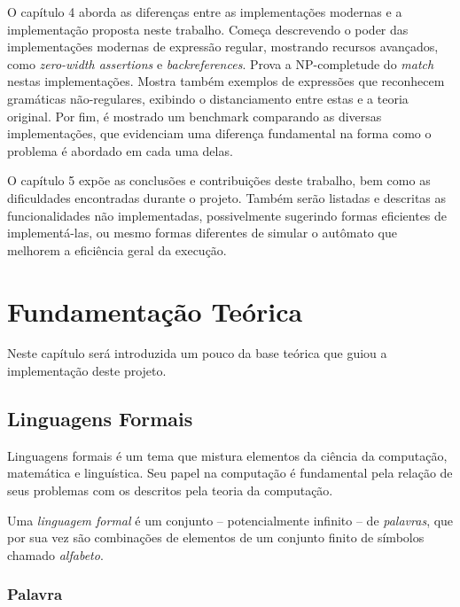 \documentclass[a4paper,12pt,oneside,onecolumn]{uerj}
\begin{document}
O capítulo 4 aborda as diferenças entre as implementações modernas e a implementação proposta neste trabalho. Começa descrevendo o poder das implementações modernas de expressão regular, mostrando recursos avançados, como \emph{zero-width assertions} e \emph{backreferences}. Prova a NP-completude do \emph{match} nestas implementações. Mostra também exemplos de expressões que reconhecem gramáticas não-regulares, exibindo o distanciamento entre estas e a teoria original. Por fim, é mostrado um benchmark comparando as diversas implementações, que evidenciam uma diferença fundamental na forma como o problema é abordado em cada uma delas.

O capítulo 5 expõe as conclusões e contribuições deste trabalho, bem como as dificuldades encontradas durante o projeto. Também serão listadas e descritas as funcionalidades não implementadas, possivelmente sugerindo formas eficientes de implementá-las, ou mesmo formas diferentes de simular o autômato que melhorem a eficiência geral da execução.

\chapter{Fundamentação Teórica}

Neste capítulo será introduzida um pouco da base teórica que guiou a implementação deste projeto.

\section{Linguagens Formais}

Linguagens formais é um tema que mistura elementos da ciência da computação, matemática e linguística. Seu papel na computação é fundamental pela relação de seus problemas com os descritos pela teoria da computação.

Uma \emph{linguagem formal} é um conjunto -- potencialmente infinito -- de \emph{palavras}, que por sua vez são combinações de elementos de um conjunto finito de símbolos chamado \emph{alfabeto}.

\subsection{Palavra}
\end{document}
